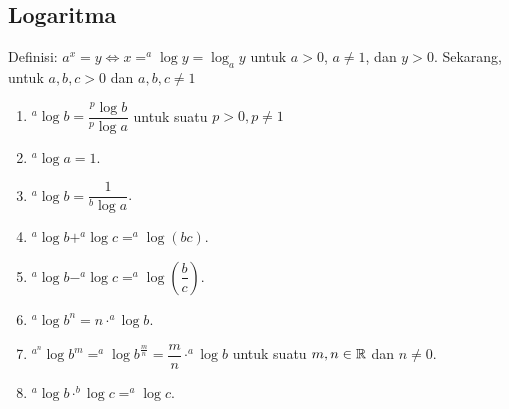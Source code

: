 \subsection{Logaritma}
Definisi: $a^x =y \iff x = ^a \log y = \log_a y$ untuk $a> 0$, $a \neq 1$, dan $y >0$.
Sekarang, untuk $a,b,c > 0$ dan $a,b,c \neq 1$
\begin{enumerate}
    \item $^a \log b = \dfrac{^p \log b}{^p \log a}$ untuk suatu $p>0, p \neq 1$
    \item $^a \log a = 1$.
    \item $^a \log b = \dfrac{1}{^b \log a}$.
    \item $^a \log b + ^a \log c = ^a \log (bc)$.
    \item $^a \log b - ^a \log c = ^a \log \left(\dfrac{b}{c}\right)$.
    \item $^a \log b^n = n \cdot ^a \log b$.
    \item $^{a^n} \log b^m = ^a \log b^{\frac{m}{n}} = \dfrac{m}{n}\cdot ^a \log b$ untuk suatu $m,n \in \mathbb R$ dan $n \neq 0$.
    \item $^a \log b \cdot ^b\log c = ^a \log c$.
\end{enumerate}